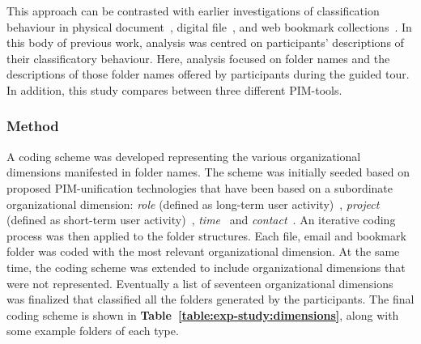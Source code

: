 This approach can be contrasted with earlier investigations of classification behaviour in physical document~\citep{kwas:91}, digital file~\citep{barreau:95}, and web bookmark collections~\citep{gd:01}. In this body of previous work, analysis was centred on participants' descriptions of their classificatory behaviour.  Here, analysis focused on folder names and the descriptions of those folder names offered by participants during the guided tour.  In addition, this study compares between three different PIM-tools.



\subsubsection{Method}

A coding scheme was developed representing the various organizational dimensions manifested in folder names.  The scheme was initially seeded based on proposed PIM-unification technologies that have been based on a subordinate organizational dimension: \textit{role} (defined as long-term user activity)~\citep{Shneiderman:94}, \textit{project} (defined as short-term user activity)~\citep{Kaptelinin:03}, \textit{time}~\citep{Gelernter:96a} and \textit{contact}~\citep{Whittaker-contactmap:02b}.
An iterative coding process was then applied to the folder structures. Each file, email and bookmark folder was coded with the most relevant organizational dimension. At the same time, the coding scheme was extended to include organizational dimensions that were not represented.  Eventually a list of seventeen organizational dimensions was finalized that classified all the folders generated by the participants. 
The final coding scheme is shown in \textbf{Table~\ref{table:exp-study:dimensions}}, along with some example folders of each type. %

